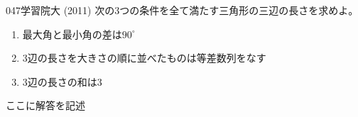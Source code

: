 \begin{prob}{047}{}{学習院大 (2011)}
 次の3つの条件を全て満たす三角形の三辺の長さを求めよ。
 \begin{enumerate}
  \renewcommand{\labelenumi}{(\alph{enumi})}
  \item 最大角と最小角の差は$90^\circ$
  \item 3辺の長さを大きさの順に並べたものは等差数列をなす
  \item 3辺の長さの和は3
 \end{enumerate}
\end{prob}
ここに解答を記述